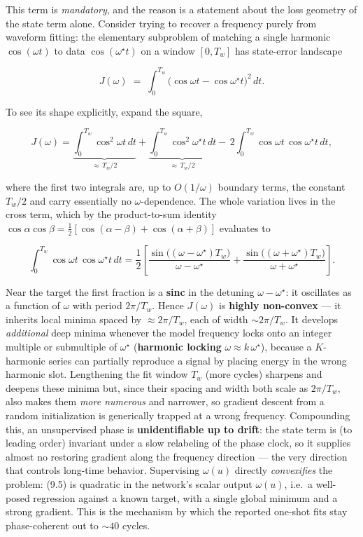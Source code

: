 \documentclass[
  11pt,
]{article}
\begin{document}
This term is \emph{mandatory}, and the reason is a statement about the
loss geometry of the state term alone. Consider trying to recover a
frequency purely from waveform fitting: the elementary subproblem of
matching a single harmonic \(\cos(\omega t)\) to data
\(\cos(\omega^\star t)\) on a window \([0,T_{\!w}]\) has state-error
landscape

\[
J(\omega)\;=\;\int_0^{T_{\!w}}\!\big(\cos\omega t-\cos\omega^\star t\big)^2\,dt .
\tag{9.6}
\]

To see its shape explicitly, expand the square,

\[
J(\omega)=\underbrace{\int_0^{T_{\!w}}\!\cos^2\omega t\,dt}_{\approx\,T_{\!w}/2}
+\underbrace{\int_0^{T_{\!w}}\!\cos^2\omega^\star t\,dt}_{\approx\,T_{\!w}/2}
-\,2\int_0^{T_{\!w}}\!\cos\omega t\,\cos\omega^\star t\,dt ,
\]

where the first two integrals are, up to \(O(1/\omega)\) boundary terms,
the constant \(T_{\!w}/2\) and carry essentially no
\(\omega\)-dependence. The whole variation lives in the cross term,
which by the product-to-sum identity
\(\cos\alpha\cos\beta=\tfrac12[\cos(\alpha-\beta)+\cos(\alpha+\beta)]\)
evaluates to

\[
\int_0^{T_{\!w}}\!\cos\omega t\,\cos\omega^\star t\,dt
=\frac12\!\left[\frac{\sin\big((\omega-\omega^\star)T_{\!w}\big)}{\omega-\omega^\star}
+\frac{\sin\big((\omega+\omega^\star)T_{\!w}\big)}{\omega+\omega^\star}\right].
\]

Near the target the first fraction is a \textbf{sinc} in the detuning
\(\omega-\omega^\star\): it oscillates as a function of \(\omega\) with
period \(2\pi/T_{\!w}\). Hence \(J(\omega)\) is \textbf{highly
non-convex} --- it inherits local minima spaced by
\(\approx 2\pi/T_{\!w}\), each of width \(\sim 2\pi/T_{\!w}\). It
develops \emph{additional} deep minima whenever the model frequency
locks onto an integer multiple or submultiple of \(\omega^\star\)
(\textbf{harmonic locking} \(\omega\approx k\,\omega^\star\)), because a
\(K\)-harmonic series can partially reproduce a signal by placing energy
in the wrong harmonic slot. Lengthening the fit window \(T_{\!w}\) (more
cycles) sharpens and deepens these minima but, since their spacing and
width both scale as \(2\pi/T_{\!w}\), also makes them \emph{more
numerous} and narrower, so gradient descent from a random initialization
is generically trapped at a wrong frequency. Compounding this, an
unsupervised phase is \textbf{unidentifiable up to drift}: the state
term is (to leading order) invariant under a slow relabeling of the
phase clock, so it supplies almost no restoring gradient along the
frequency direction --- the very direction that controls long-time
behavior. Supervising \(\omega(u)\) directly \emph{convexifies} the
problem: (9.5) is quadratic in the network's scalar output
\(\omega(u)\), i.e.~a well-posed regression against a known target, with
a single global minimum and a strong gradient. This is the mechanism by
which the reported one-shot fits stay phase-coherent out to \(\sim40\)
cycles.
\end{document}
